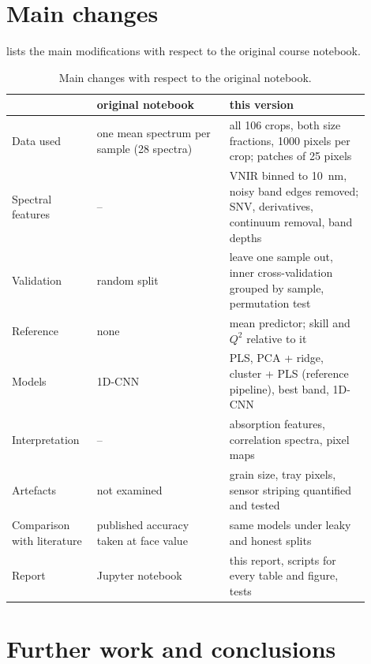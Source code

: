 \documentclass[11pt,a4paper]{article}
\begin{document}
\section{Main changes}\label{sec:lessons}

 lists the main modifications with respect to the original course notebook.

\begin{table}[H]
  \centering\small
  \caption{Main changes with respect to the original notebook.}
  \label{tab:changes}
  \begin{tabular}{p{0.2\linewidth}p{0.34\linewidth}p{0.36\linewidth}}
    \toprule
    & original notebook & this version \\
    \midrule
    Data used & one mean spectrum per sample (28 spectra) & all 106 crops, both size fractions, 1000 pixels per
      crop; patches of 25 pixels \\
    Spectral features & -- & VNIR binned to \SI{10}{nm}, noisy band edges removed;
      SNV, derivatives, continuum removal, band depths \\
    Validation & random split & leave one sample out, inner cross-validation grouped by sample, permutation test \\
    Reference & none & mean predictor; skill and $Q^2$ relative to it \\
    Models & 1D-CNN & PLS, PCA + ridge, cluster + PLS (reference pipeline), best band, 1D-CNN \\
    Interpretation & -- & absorption features, correlation spectra, pixel maps \\
    Artefacts & not examined & grain size, tray pixels, sensor striping quantified and tested \\
    Comparison with literature & published accuracy taken at face value & same models under leaky and honest
      splits \\
    Report & Jupyter notebook & this report, scripts for every table and figure, tests \\
    \bottomrule
  \end{tabular}
\end{table}

\section{Further work and conclusions}\label{sec:next}
\end{document}
